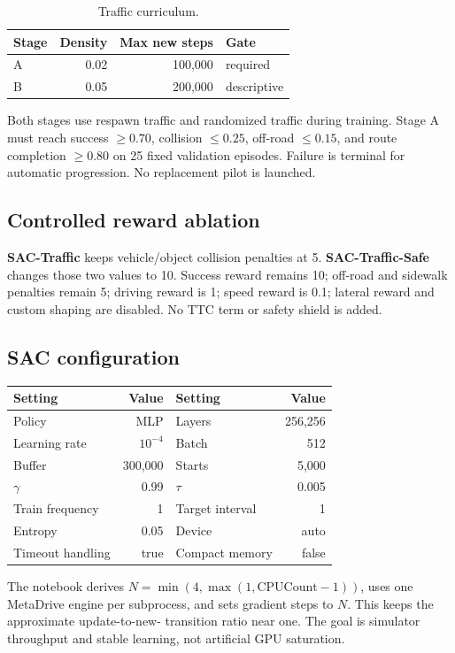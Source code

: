 \documentclass[10pt,twocolumn]{article}
\begin{document}
\begin{table}[t]
\centering
\caption{Traffic curriculum.}
\begin{tabular}{lrrl}
\toprule
Stage & Density & Max new steps & Gate \\
\midrule
A & 0.02 & 100,000 & required \\
B & 0.05 & 200,000 & descriptive \\
\bottomrule
\end{tabular}
\end{table}

Both stages use respawn traffic and randomized traffic during training. Stage A must
reach success $\geq0.70$, collision $\leq0.25$, off-road $\leq0.15$, and route
completion $\geq0.80$ on 25 fixed validation episodes. Failure is terminal for automatic
progression. No replacement pilot is launched.

\subsection{Controlled reward ablation}
\textbf{SAC-Traffic} keeps vehicle/object collision penalties at 5.
\textbf{SAC-Traffic-Safe} changes those two values to 10. Success reward remains 10;
off-road and sidewalk penalties remain 5; driving reward is 1; speed reward is 0.1;
lateral reward and custom shaping are disabled. No TTC term or safety shield is added.

\subsection{SAC configuration}
\begin{center}\small
\setlength{\tabcolsep}{3pt}
\begin{tabular}{lr@{\qquad}lr}
\toprule
Setting & Value & Setting & Value \\
\midrule
Policy & MLP & Layers & 256,256 \\
Learning rate & $10^{-4}$ & Batch & 512 \\
Buffer & 300,000 & Starts & 5,000 \\
$\gamma$ & 0.99 & $\tau$ & 0.005 \\
Train frequency & 1 & Target interval & 1 \\
Entropy & 0.05 & Device & auto \\
Timeout handling & true & Compact memory & false \\
\bottomrule
\end{tabular}
\end{center}
The notebook derives $N=\min(4,\max(1,\mathrm{CPUCount}-1))$, uses one MetaDrive engine
per subprocess, and sets gradient steps to $N$. This keeps the approximate update-to-new-
transition ratio near one. The goal is simulator throughput and stable learning, not
artificial GPU saturation.
\end{document}
